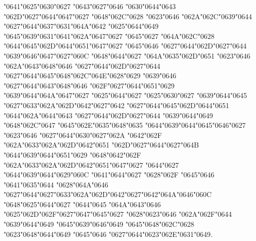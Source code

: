 {\char"0641}{\char"0625}{\char"0630}{\char"0627} {\char"0643}{\char"0627}{\char"0646} {\char"0630}{\char"0644}{\char"0643} {\char"062D}{\char"0627}{\char"0644}{\char"0647}{\char"0627} {\char"0648}{\char"062C}{\char"0628} {\char"0623}{\char"0646} {\char"062A}{\char"062C}{\char"0639}{\char"0644} {\char"0627}{\char"0644}{\char"0637}{\char"0631}{\char"064A}{\char"0642} {\char"0625}{\char"0644}{\char"0649} {\char"0645}{\char"0639}{\char"0631}{\char"0641}{\char"062A}{\char"0647}{\char"0627} {\char"0645}{\char"0627} {\char"064A}{\char"062C}{\char"0628} {\char"0644}{\char"0645}{\char"062D}{\char"0644}{\char"0651}{\char"0647}{\char"0627} {\char"0645}{\char"0646} {\char"0627}{\char"0644}{\char"062D}{\char"0627}{\char"0644} {\char"0639}{\char"0646}{\char"0647}{\char"0627}{\char"060C} {\char"0648}{\char"0644}{\char"0627} {\char"064A}{\char"0635}{\char"062D}{\char"0651} {\char"0623}{\char"0646} {\char"062A}{\char"0643}{\char"0648}{\char"0646} {\char"0627}{\char"0644}{\char"062D}{\char"0627}{\char"0644} {\char"0627}{\char"0644}{\char"0645}{\char"0648}{\char"062C}{\char"064E}{\char"0628}{\char"0629} {\char"0639}{\char"0646} {\char"0627}{\char"0644}{\char"0643}{\char"0648}{\char"0646} {\char"062F}{\char"0627}{\char"0644}{\char"0651}{\char"0629} {\char"0639}{\char"0644}{\char"064A}{\char"0647}{\char"0627} {\char"0625}{\char"0644}{\char"0627} {\char"0625}{\char"0630}{\char"0627} {\char"0639}{\char"0644}{\char"0645} {\char"0627}{\char"0633}{\char"062A}{\char"062D}{\char"0642}{\char"0627}{\char"0642} {\char"0627}{\char"0644}{\char"0645}{\char"062D}{\char"0644}{\char"0651} {\char"0644}{\char"062A}{\char"0644}{\char"0643} {\char"0627}{\char"0644}{\char"062D}{\char"0627}{\char"0644} {\char"0639}{\char"0644}{\char"0649} {\char"0648}{\char"062C}{\char"0647} {\char"0645}{\char"062E}{\char"0635}{\char"0648}{\char"0635} {\char"0644}{\char"0639}{\char"0644}{\char"0645}{\char"0646}{\char"0627} {\char"0623}{\char"0646} {\char"0627}{\char"0644}{\char"0630}{\char"0627}{\char"062A} {\char"0642}{\char"062F} {\char"062A}{\char"0633}{\char"062A}{\char"062D}{\char"0642}{\char"0651} {\char"062D}{\char"0627}{\char"0644}{\char"0627}{\char"064B} {\char"0644}{\char"0639}{\char"0644}{\char"0651}{\char"0629} {\char"0648}{\char"0642}{\char"062F} {\char"062A}{\char"0633}{\char"062A}{\char"062D}{\char"0642}{\char"0651}{\char"0647}{\char"0627} {\char"0644}{\char"0627} {\char"0644}{\char"0639}{\char"0644}{\char"0629}{\char"060C} {\char"0641}{\char"0644}{\char"0627} {\char"0628}{\char"062F} {\char"0645}{\char"0646} {\char"0641}{\char"0635}{\char"0644} {\char"0628}{\char"064A}{\char"0646} {\char"0627}{\char"0644}{\char"0627}{\char"0633}{\char"062A}{\char"062D}{\char"0642}{\char"0627}{\char"0642}{\char"064A}{\char"0646}{\char"060C} {\char"0648}{\char"0625}{\char"0644}{\char"0627} {\char"0644}{\char"0645} {\char"064A}{\char"0643}{\char"0646} {\char"0625}{\char"062D}{\char"062F}{\char"0627}{\char"0647}{\char"0645}{\char"0627} {\char"0628}{\char"0623}{\char"0646} {\char"062A}{\char"062F}{\char"0644} {\char"0639}{\char"0644}{\char"0649} {\char"0645}{\char"0639}{\char"0646}{\char"0649} {\char"0645}{\char"0648}{\char"062C}{\char"0628} {\char"0623}{\char"0648}{\char"0644}{\char"0649} {\char"0645}{\char"0646} {\char"0627}{\char"0644}{\char"0623}{\char"062E}{\char"0631}{\char"0649}. 